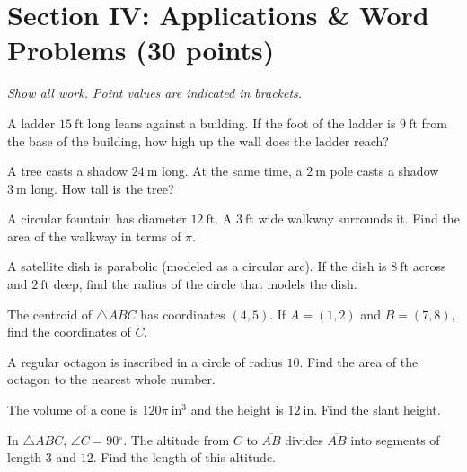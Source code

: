 \documentclass[12pt,addpoints]{exam}
\newcommand{\deg}{{}^\circ}
\begin{document}
\section*{Section IV: Applications \& Word Problems \hfill (30 points)}
\noindent\textit{Show all work. Point values are indicated in brackets.}

\begin{questions}

\question[4] A ladder $15~\text{ft}$ long leans against a building. If the foot of the ladder is $9~\text{ft}$ from the base of the building, how high up the wall does the ladder reach?

\vspace{1.5cm}

\question[5] A tree casts a shadow $24~\text{m}$ long. At the same time, a $2~\text{m}$ pole casts a shadow $3~\text{m}$ long. How tall is the tree?

\vspace{1.5cm}

\question[5] A circular fountain has diameter $12~\text{ft}$. A $3~\text{ft}$ wide walkway surrounds it. Find the area of the walkway in terms of $\pi$.

\vspace{1.5cm}

\question[5] A satellite dish is parabolic (modeled as a circular arc). If the dish is $8~\text{ft}$ across and $2~\text{ft}$ deep, find the radius of the circle that models the dish.

\vspace{1.5cm}

\question[5] The centroid of $\triangle ABC$ has coordinates $(4, 5)$. If $A = (1, 2)$ and $B = (7, 8)$, find the coordinates of $C$.

\vspace{1.5cm}

\question[5] A regular octagon is inscribed in a circle of radius $10$. Find the area of the octagon to the nearest whole number.

\vspace{1.5cm}

\question[5] The volume of a cone is $120\pi~\text{in}^3$ and the height is $12~\text{in}$. Find the slant height.

\vspace{1.5cm}

\question[4] In $\triangle ABC$, $\angle C = 90\deg$. The altitude from $C$ to $\overline{AB}$ divides $\overline{AB}$ into segments of length $3$ and $12$. Find the length of this altitude.

\vspace{1.5cm}

\end{questions}
\end{document}
